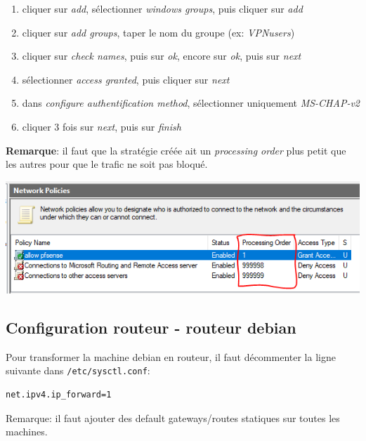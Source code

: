 \documentclass[a4paper]{article}
\begin{document}
\begin{itemize}
\begin{enumerate}
        \item cliquer sur \textit{add}, sélectionner \textit{windows groups}, puis cliquer sur \textit{add}
        \item cliquer sur \textit{add groups}, taper le nom du groupe (ex: \textit{VPNusers})
        \item cliquer sur \textit{check names}, puis sur \textit{ok}, encore sur \textit{ok}, puis sur \textit{next}
        \item sélectionner \textit{access granted}, puis cliquer sur \textit{next}
        \item dans \textit{configure authentification method}, sélectionner uniquement \textit{MS-CHAP-v2}
        \item cliquer 3 fois sur \textit{next}, puis sur \textit{finish}
    \end{enumerate}
\end{itemize}
\textbf{Remarque}: il faut que la stratégie créée ait un \textit{processing order} plus petit que les autres pour que le trafic ne soit pas bloqué.
\begin{center} \includegraphics[width=0.65\linewidth]{images/network-policies-order-01.PNG} \end{center}










\subsection{Configuration routeur - routeur debian}





Pour transformer la machine debian en routeur, il faut décommenter la ligne suivante dans \texttt{/etc/sysctl.conf}:
\begin{example} \begin{verbatim}
net.ipv4.ip_forward=1
\end{verbatim} \end{example}
Remarque: il faut ajouter des default gateways/routes statiques sur toutes les machines.
\end{document}
